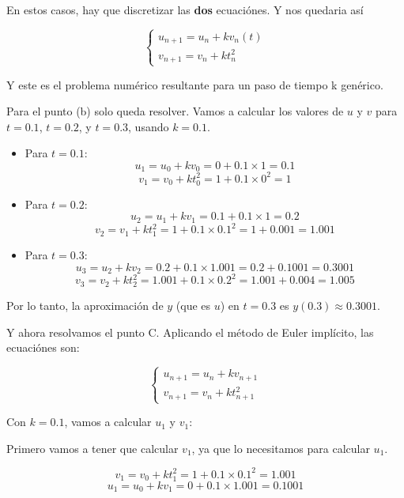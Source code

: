 En estos casos, hay que discretizar las \textbf{dos} ecuaciónes. Y nos quedaria así 

\begin{equation}
\left\{
\begin{array}{l}
u_{n+1} = u_n + kv_n(t) \\
v_{n+1} = v_n + kt_n^2
\end{array}
\right.
\end{equation}

Y este es el problema numérico resultante para un paso de tiempo k genérico.

Para el punto (b) solo queda resolver. Vamos a calcular los valores de \( u \) y \( v \) para \( t = 0.1 \), \( t = 0.2 \), y \( t = 0.3 \), usando \( k = 0.1 \).

\begin{itemize}
    \item Para \( t = 0.1 \):
    \[
    u_1 = u_0 + k v_0 = 0 + 0.1 \times 1 = 0.1
    \]
    \[
    v_1 = v_0 + k t_0^2 = 1 + 0.1 \times 0^2 = 1
    \]
    
    \item Para \( t = 0.2 \):
    \[
    u_2 = u_1 + k v_1 = 0.1 + 0.1 \times 1 = 0.2
    \]
    \[
    v_2 = v_1 + k t_1^2 = 1 + 0.1 \times 0.1^2 = 1 + 0.001 = 1.001
    \]
    
    \item Para \( t = 0.3 \):
    \[
    u_3 = u_2 + k v_2 = 0.2 + 0.1 \times 1.001 = 0.2 + 0.1001 = 0.3001
    \]
    \[
    v_3 = v_2 + k t_2^2 = 1.001 + 0.1 \times 0.2^2 = 1.001 + 0.004 = 1.005
    \]
\end{itemize}

Por lo tanto, la aproximación de \( y \) (que es \( u \)) en \( t = 0.3 \) es \( y(0.3) \approx 0.3001 \).

Y ahora resolvamos el punto C. 
Aplicando el método de Euler implícito, las ecuaciónes son:

\begin{equation}
\left\{
\begin{array}{l}
u_{n+1} = u_n + k v_{n+1} \\
v_{n+1} = v_n + k t_{n+1}^2
\end{array}
\right.
\end{equation}

Con \( k = 0.1 \), vamos a calcular \( u_1 \) y \( v_1 \):

Primero vamos a tener que calcular $v_1$, ya que lo necesitamos para calcular $u_1$.

\[
v_1 = v_0 + k t_1^2 = 1 + 0.1 \times 0.1^2 = 1.001
\]
\[
u_1 = u_0 + k v_1 = 0 + 0.1 \times 1.001 = 0.1001
\]

